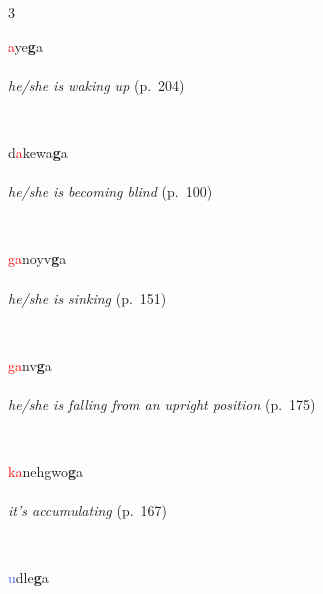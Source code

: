 \documentclass[oneside,openany]{book}%
\begin{document}
\noindent\begin{multicols}{3}%
\begin{minipage}[t]{\linewidth}
\raggedright\noindent \textcolor{Red}{a}ye\textbf{g}a\\
\\
\noindent \textit{he/she is waking up} (p.~204)
\end{minipage}\\[1em]%
\begin{minipage}[t]{\linewidth}
\raggedright\noindent d\textcolor{Red}{a}kewa\textbf{g}a\\
\\
\noindent \textit{he/she is becoming blind} (p.~100)
\end{minipage}\\[1em]%
\begin{minipage}[t]{\linewidth}
\raggedright\noindent \textcolor{Red}{ga}noyv\textbf{g}a\\
\\
\noindent \textit{he/she is sinking} (p.~151)
\end{minipage}\\[1em]%
\begin{minipage}[t]{\linewidth}
\raggedright\noindent \textcolor{Red}{ga}nv\textbf{g}a\\
\\
\noindent \textit{he/she is falling from an upright position} (p.~175)
\end{minipage}\\[1em]%
\begin{minipage}[t]{\linewidth}
\raggedright\noindent \textcolor{Red}{ka}nehgwo\textbf{g}a\\
\\
\noindent \textit{it's accumulating} (p.~167)
\end{minipage}\\[1em]%
\begin{minipage}[t]{\linewidth}
\raggedright\noindent \textcolor{RoyalBlue}{u}dle\textbf{g}a\\
\\

\end{minipage}
\end{multicols}
\end{document}

